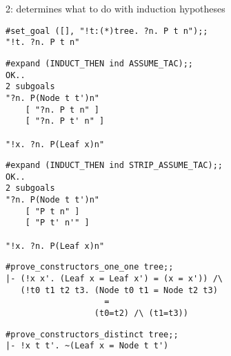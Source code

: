 2: determines what to do with induction hypotheses
\espindent





\begin{session}\begin{verbatim}
#set_goal ([], "!t:(*)tree. ?n. P t n");;
"!t. ?n. P t n"
\end{verbatim}\end{session}


\begin{session}\begin{verbatim}
#expand (INDUCT_THEN ind ASSUME_TAC);;
OK..
2 subgoals
"?n. P(Node t t')n"
    [ "?n. P t n" ]
    [ "?n. P t' n" ]

"!x. ?n. P(Leaf x)n"
\end{verbatim}\end{session}



\begin{session}\begin{verbatim}
#expand (INDUCT_THEN ind STRIP_ASSUME_TAC);;
OK..
2 subgoals
"?n. P(Node t t')n"
    [ "P t n" ]
    [ "P t' n'" ]

"!x. ?n. P(Leaf x)n"
\end{verbatim}\end{session}



\begin{session}\begin{verbatim}
#prove_constructors_one_one tree;;
|- (!x x'. (Leaf x = Leaf x') = (x = x')) /\
   (!t0 t1 t2 t3. (Node t0 t1 = Node t2 t3)
                    = 
                  (t0=t2) /\ (t1=t3))
\end{verbatim}\end{session}



\begin{session}\begin{verbatim}
#prove_constructors_distinct tree;;
|- !x t t'. ~(Leaf x = Node t t')
\end{verbatim}\end{session}


